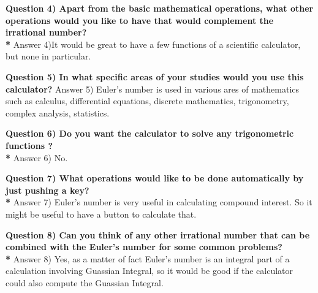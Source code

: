\documentclass{article}
\begin{document}
\noindent \textbf {Question 4) Apart from the basic mathematical operations, what other operations would you like to have that would complement the     irrational number? \\*}
\noindent Answer 4)It would be great to have a few functions of a scientific calculator, but none in particular. 
\begin{flushleft}
\hrulefill
\end{flushleft}
\noindent \textbf {Question 5) In what specific areas of your studies would you use this calculator? }
\noindent Answer 5) Euler's number is used in various ares of mathematics such as calculus, differential equations, discrete mathematics, trigonometry, complex analysis, statistics.
\begin{flushleft}
\hrulefill
\end{flushleft}
\noindent \textbf {Question 6) Do you want the calculator to solve any trigonometric functions ?\\*}
\noindent Answer 6) No.
\begin{flushleft}
\hrulefill
\end{flushleft}

\noindent \textbf {Question 7) What operations would like to be done automatically by just pushing a key?\\*}
\noindent Answer 7) Euler's number is very useful in calculating compound interest. So it might be useful to have a button to calculate that.
\begin{flushleft}
\hrulefill
\end{flushleft}
\noindent \textbf {Question 8) Can you think of any other irrational number that can be combined with the Euler's number for some common problems?\\*}
\noindent Answer 8) Yes, as a matter of fact Euler's number is an integral part of a calculation involving Guassian Integral, so it would be good if the calculator could also compute the Guassian Integral.
\begin{flushleft}
\hrulefill
\end{flushleft}

 


 
\end{document}
